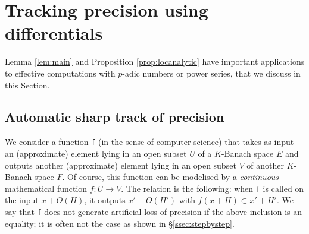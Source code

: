 \documentclass{lms}
\begin{document}
%
%

\section{Tracking precision using differentials}
\label{sec:tracking}

Lemma \ref{lem:main} and Proposition \ref{prop:locanalytic} have 
important applications to effective computations with $p$-adic numbers 
or power series, that we discuss in this Section. 

\subsection{Automatic sharp track of precision}

We consider a function {\tt f} (in the sense of computer 
science) that takes as input an (approximate) element lying in an open 
subset $U$ of a $K$-Banach space $E$ and outputs another (approximate) 
element lying in an open subset $V$ of another $K$-Banach space $F$. Of 
course, this function can be modelised by a \emph{continuous} 
mathematical function $f : U \to V$. The relation is the following: when 
{\tt f} is called on the input $x + O(H)$, it outputs $x' + O(H')$ with 
$f(x+H) \subset x' + H'$. We say that {\tt f} does not generate 
artificial loss of precision if the above inclusion is an equality; it is 
often not the case as shown in \S \ref{ssec:stepbystep}.
\end{document}
